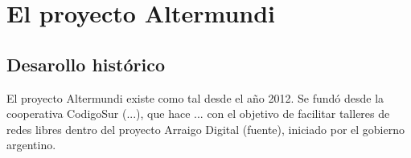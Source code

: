 \section{El proyecto Altermundi}

\subsection{Desarollo histórico}

El proyecto Altermundi existe como tal desde el año 2012.
Se fundó desde la cooperativa CodigoSur (...), que hace ... con el objetivo de facilitar talleres de redes libres dentro del proyecto Arraigo Digital (fuente), iniciado por el gobierno argentino.

